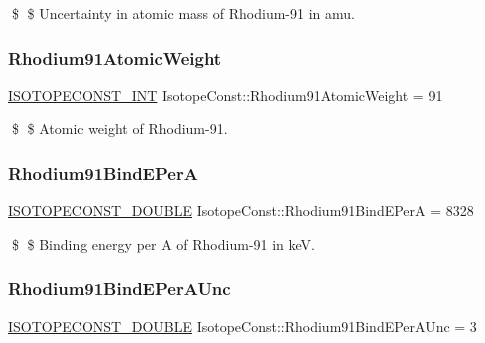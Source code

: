 \$ \$ Uncertainty in atomic mass of Rhodium-\/91 in amu. \mbox{\label{group___isotope_const-_rhodium-_rh91_ga475c9abf92863a1bc05e2fa4b7c1db0c}} 
\subsubsection{\texorpdfstring{Rhodium91\+Atomic\+Weight}{Rhodium91AtomicWeight}}
{\footnotesize\ttfamily \mbox{\hyperlink{group___isotope_const-_macros_ga5f18360b3e99483a35c32d789e62621c}{I\+S\+O\+T\+O\+P\+E\+C\+O\+N\+S\+T\+\_\+\+I\+NT}} Isotope\+Const\+::\+Rhodium91\+Atomic\+Weight = 91}

\$ \$ Atomic weight of Rhodium-\/91. \mbox{\label{group___isotope_const-_rhodium-_rh91_ga5e7f35e65643c74ac53b752d7b43a28f}} 
\subsubsection{\texorpdfstring{Rhodium91\+Bind\+E\+PerA}{Rhodium91BindEPerA}}
{\footnotesize\ttfamily \mbox{\hyperlink{group___isotope_const-_macros_ga8f45a7272ce02c0b4c65c44636ed719a}{I\+S\+O\+T\+O\+P\+E\+C\+O\+N\+S\+T\+\_\+\+D\+O\+U\+B\+LE}} Isotope\+Const\+::\+Rhodium91\+Bind\+E\+PerA = 8328}

\$ \$ Binding energy per A of Rhodium-\/91 in keV. \mbox{\label{group___isotope_const-_rhodium-_rh91_gabacdc218e0d014926e699dc30c4ce192}} 
\subsubsection{\texorpdfstring{Rhodium91\+Bind\+E\+Per\+A\+Unc}{Rhodium91BindEPerAUnc}}
{\footnotesize\ttfamily \mbox{\hyperlink{group___isotope_const-_macros_ga8f45a7272ce02c0b4c65c44636ed719a}{I\+S\+O\+T\+O\+P\+E\+C\+O\+N\+S\+T\+\_\+\+D\+O\+U\+B\+LE}} Isotope\+Const\+::\+Rhodium91\+Bind\+E\+Per\+A\+Unc = 3}

